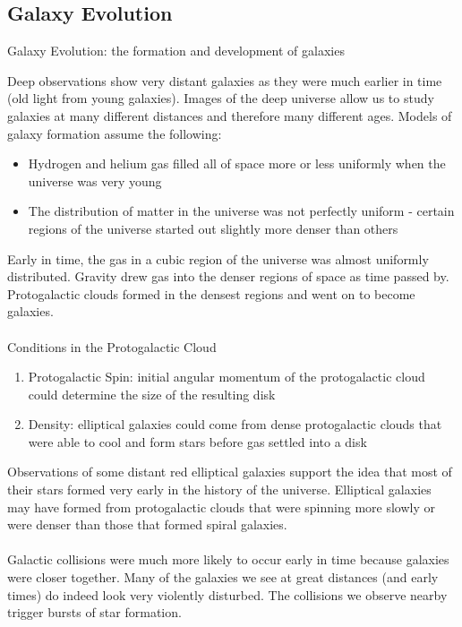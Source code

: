 \documentclass[12pt]{article}
\begin{document}
\subsection{Galaxy Evolution}
\begin{definition} Galaxy Evolution: the formation and development of galaxies \end{definition} 
Deep observations show very distant galaxies as they were much earlier in time (old light from young galaxies). Images of the deep universe allow us to study galaxies at many different distances and therefore many different ages. \newpage
Models of galaxy formation assume the following: \begin{itemize} 
\item Hydrogen and helium gas filled all of space more or less uniformly when the universe was very young 
\item The distribution of matter in the universe was not perfectly uniform - certain regions of the universe started out slightly more denser than others \end{itemize} 
Early in time, the gas in a cubic region of the universe was almost uniformly distributed. Gravity drew gas into the denser regions of space as time passed by. Protogalactic clouds formed in the densest regions and went on to become galaxies. \\~\\ 
Conditions in the Protogalactic Cloud \begin{enumerate} 
\item Protogalactic Spin: initial angular momentum of the protogalactic cloud could determine the size of the resulting disk 
\item Density: elliptical galaxies could come from dense protogalactic clouds that were able to cool and form stars before gas settled into a disk \end{enumerate} 
Observations of some distant red elliptical galaxies support the idea that most of their stars formed very early in the history of the universe. Elliptical galaxies may have formed from protogalactic clouds that were spinning more slowly or were denser than those that formed spiral galaxies. \\~\\
Galactic collisions were much more likely to occur early in time because galaxies were closer together. Many of the galaxies we see at great distances (and early times) do indeed look very violently disturbed. The collisions we observe nearby trigger bursts of star formation. \\~\\ 
\end{document}
